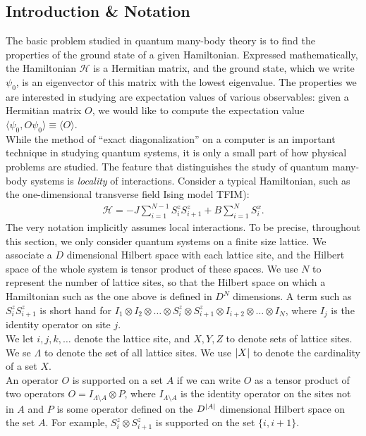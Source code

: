 \documentclass{book}
\theoremstyle{definition}
\newcommand{\had}{\mathcal{H}}
\begin{document}
\subsection{Introduction \& Notation}

The basic problem studied in quantum many-body theory is to find the properties of the ground state of a given
Hamiltonian. Expressed mathematically, the Hamiltonian $\had$ is a Hermitian matrix, and the ground state, which we write $\psi_0$, is an eigenvector of this matrix with the lowest eigenvalue.  The properties we are interested in studying
are expectation values of various observables: given a Hermitian matrix $O$, we would like to compute the expectation value $\langle \psi_0 , O \psi_0\rangle \equiv \langle O \rangle$. \\

While the method of ``exact diagonalization'' on a computer is an important technique in studying
quantum systems, it is only a small part of how physical problems are studied. The feature that distinguishes the study of quantum many-body systems is \textit{locality} of interactions. Consider a typical Hamiltonian, such as the one-dimensional transverse field Ising model TFIM):
\begin{align}
\had = -J \sum^{N-1}_{i=1}S^z_i S^z_{i+1} + B \sum^{N}_{i=1}S_i^x.
\end{align}
The very notation implicitly assumes local interactions. To be precise, throughout this section, we only consider quantum systems on a finite size lattice. We associate a $D$ dimensional Hilbert space with each lattice site, and the Hilbert space of the whole system is tensor product of these spaces. We use $N$ to represent the number of lattice sites, so that the Hilbert space on which a Hamiltonian such as the one above is defined in $D^N$ dimensions. A term such as $S^z_i S^z_{i+1}$ is short hand for $I_1 \otimes I_2 \otimes \dots \otimes S_i^z \otimes S^z_{i+1} \otimes I_{i+2} \otimes \dots \otimes I_N$, where $I_j$ is the identity operator on site $j$.\\

We let $i,j,k,\dots$ denote the lattice site, and $X,Y,Z$ to denote sets of lattice sites. We se $\Lambda$ to denote the set of all lattice sites. We use $\abs{X}$ to denote the cardinality of a set $X$. \\

An operator $O$ is supported on a set $A$ if we can write $O$ as a tensor product of two operators $O = I_{\Lambda\setminus A} \otimes P$, where $I_{\Lambda \setminus A}$ is the identity operator on the sites not in $A$ and $P$ is some operator defined on the $D^{\abs{A}}$ dimensional Hilbert space on the set $A$. For example, $S^z_i \otimes S^z_{i+1}$ is supported on the set $\{ i, i+1\}$. \\
\end{document}
